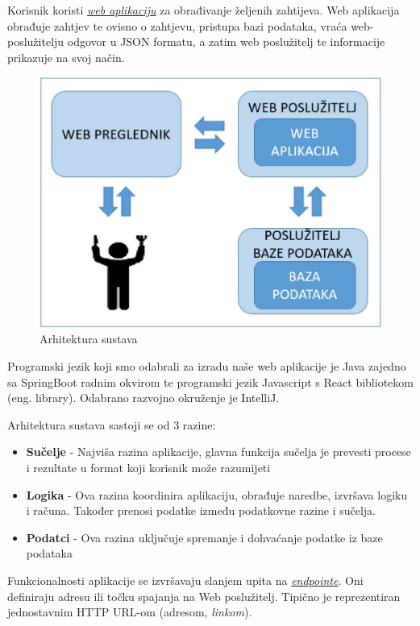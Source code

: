 	Korisnik koristi \underline{\textit{web aplikaciju}} za obrađivanje željenih zahtijeva. Web aplikacija obrađuje zahtjev te ovisno o zahtjevu, pristupa bazi podataka, vraća web-poslužitelju odgovor u JSON formatu, a zatim web poslužitelj te informacije prikazuje na svoj način.
		\begin{figure}[H]
                    \includegraphics[scale=1]{slike/Arhitektura sustava.jpg}
        			\centering
        			\caption{Arhitektura sustava}
        			\label{fig:hztm-stranica}
        		\end{figure}
			
			\eject

	Programski jezik koji smo odabrali za izradu naše web aplikacije je Java zajedno sa SpringBoot radnim okvirom te programski jezik Javascript s React bibliotekom (eng. library). Odabrano razvojno okruženje je IntelliJ. 
	
	Arhitektura sustava sastoji se od 3 razine:
	\begin{itemize}
		\item{\textbf{Sučelje} - Najviša razina aplikacije, glavna funkcija sučelja je prevesti procese i rezultate u format koji korisnik može razumijeti}
		\item{\textbf{Logika} - Ova razina koordinira aplikaciju, obrađuje naredbe, izvršava logiku i računa. Također prenosi podatke između podatkovne razine i sučelja.}
		\item{\textbf{Podatci} - Ova razina uključuje spremanje i dohvaćanje podatke iz baze podataka}		
	\end{itemize}
	
	Funkcionalnosti aplikacije se izvršavaju slanjem upita na \textit{\underline{endpointe}}. Oni definiraju adresu ili točku spajanja na Web poslužitelj. Tipično je reprezentiran jednostavnim HTTP URL-om (adresom, \textit{linkom}).
	
